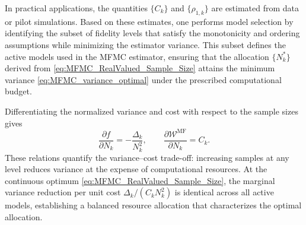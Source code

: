 In practical applications, the quantities $\{C_k\}$ and $\{\rho_{1,k}\}$ are estimated from data or pilot simulations. Based on these estimates, one performs model selection by identifying the subset of fidelity levels that satisfy the monotonicity and ordering assumptions while minimizing the estimator variance. This subset defines the active models used in the MFMC estimator, ensuring that the allocation $\{N_k^*\}$ derived from \eqref{eq:MFMC_RealValued_Sample_Size} attains the minimum variance \eqref{eq:MFMC_variance_optimal} under the prescribed computational budget.


Differentiating the normalized variance and cost with respect to the sample sizes gives
%
\[
\frac{\partial f}{\partial N_k} = -\frac{\Delta_k}{N_k^2},
\qquad 
\frac{\partial \mathcal{W}^{\text{MF}}}{\partial N_k} = C_k.
\]
%
These relations quantify the variance–cost trade-off: increasing samples at any level reduces variance at the expense of computational resources. At the continuous optimum \eqref{eq:MFMC_RealValued_Sample_Size}, the marginal variance reduction per unit cost $\Delta_k/(C_k N_k^2)$ is identical across all active models, establishing a balanced resource allocation that characterizes the optimal allocation.


